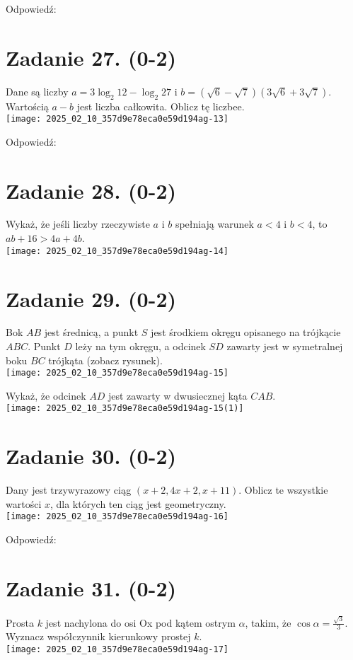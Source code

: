 \documentclass[10pt]{article}
\begin{document}
Odpowiedź:

\section*{Zadanie 27. (0-2)}
Dane są liczby \(a=3 \log _{2} 12-\log _{2} 27\) i \(b=(\sqrt{6}-\sqrt{7})(3 \sqrt{6}+3 \sqrt{7})\). Wartością \(a-b\) jest liczba całkowita. Oblicz tę liczbee.\\
\texttt{[image: 2025\_02\_10\_357d9e78eca0e59d194ag-13]}

Odpowiedź:

\section*{Zadanie 28. (0-2)}
Wykaż, że jeśli liczby rzeczywiste \(a\) i \(b\) spełniają warunek \(a<4\) i \(b<4\), to \(a b+16>4 a+4 b\).\\
\texttt{[image: 2025\_02\_10\_357d9e78eca0e59d194ag-14]}

\section*{Zadanie 29. (0-2)}
Bok \(A B\) jest średnicą, a punkt \(S\) jest środkiem okręgu opisanego na trójkącie \(A B C\). Punkt \(D\) leży na tym okręgu, a odcinek \(S D\) zawarty jest w symetralnej boku \(B C\) trójkąta (zobacz rysunek).\\
\texttt{[image: 2025\_02\_10\_357d9e78eca0e59d194ag-15]}

Wykaż, że odcinek \(A D\) jest zawarty w dwusiecznej kąta \(C A B\).\\
\texttt{[image: 2025\_02\_10\_357d9e78eca0e59d194ag-15(1)]}

\section*{Zadanie 30. (0-2)}
Dany jest trzywyrazowy ciąg \((x+2,4 x+2, x+11)\). Oblicz te wszystkie wartości \(x\), dla których ten ciąg jest geometryczny.\\
\texttt{[image: 2025\_02\_10\_357d9e78eca0e59d194ag-16]}

Odpowiedź:

\section*{Zadanie 31. (0-2)}
Prosta \(k\) jest nachylona do osi Ox pod kątem ostrym \(\alpha\), takim, że \(\cos \alpha=\frac{\sqrt{3}}{3}\). Wyznacz współczynnik kierunkowy prostej \(k\).\\
\texttt{[image: 2025\_02\_10\_357d9e78eca0e59d194ag-17]}
\end{document}
